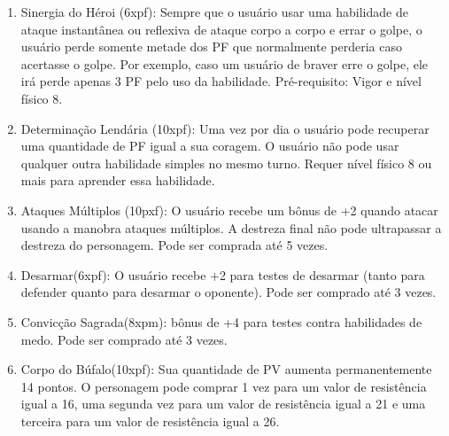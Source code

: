 \begin{enumerate}
	\item Sinergia do Héroi (6xpf): Sempre que o usuário usar uma habilidade de ataque instantânea ou reflexiva de ataque corpo a corpo e errar o golpe, o usuário perde somente metade dos PF que normalmente perderia caso acertasse o golpe. Por exemplo, caso um usuário de braver erre o golpe, ele irá perde apenas 3 PF pelo uso da habilidade. Pré-requisito: Vigor e nível físico 8.

	\item Determinação Lendária (10xpf): Uma vez por dia o usuário pode recuperar uma quantidade de PF igual a sua coragem. O usuário não pode usar qualquer outra habilidade simples no mesmo turno. Requer nível físico 8 ou mais para aprender essa habilidade. 

	\item Ataques Múltiplos (10pxf): O usuário recebe um bônus de +2 quando atacar usando a manobra ataques múltiplos. A destreza final não pode ultrapassar a destreza do personagem. Pode ser comprada até 5 vezes. 	

	
  	\item Desarmar(6xpf): O usuário recebe +2 para testes de desarmar (tanto para defender quanto para desarmar o oponente). Pode ser comprado até 3 vezes.
	
	\item Convicção Sagrada(8xpm): bônus de +4 para testes contra habilidades de medo. Pode ser comprado até 3 vezes.

    \item Corpo do Búfalo(10xpf): Sua quantidade de PV aumenta permanentemente 14 pontos. O personagem pode comprar 1 vez para um valor de resistência igual a 16, uma segunda vez para um valor de resistência igual a 21 e uma terceira para um valor de resistência igual a 26.
	
	
	
\end{enumerate}

